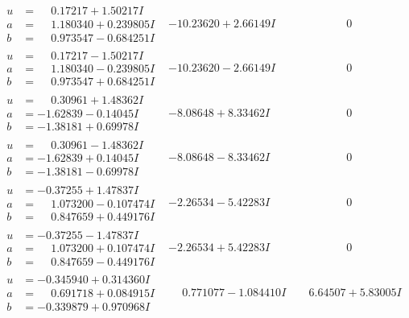 \documentclass[1p]{elsarticle_modified}
\theoremstyle{definition}
\begin{document}
$$\begin{array}{c|c|c}
\begin{aligned}
u &= \phantom{-}0.17217 + 1.50217 I \\
a &= \phantom{-}1.180340 + 0.239805 I \\
b &= \phantom{-}0.973547 - 0.684251 I\end{aligned}
 & -10.23620 + 2.66149 I & \phantom{-0.000000 } 0 \\ \hline\begin{aligned}
u &= \phantom{-}0.17217 - 1.50217 I \\
a &= \phantom{-}1.180340 - 0.239805 I \\
b &= \phantom{-}0.973547 + 0.684251 I\end{aligned}
 & -10.23620 - 2.66149 I & \phantom{-0.000000 } 0 \\ \hline\begin{aligned}
u &= \phantom{-}0.30961 + 1.48362 I \\
a &= -1.62839 - 0.14045 I \\
b &= -1.38181 + 0.69978 I\end{aligned}
 & -8.08648 + 8.33462 I & \phantom{-0.000000 } 0 \\ \hline\begin{aligned}
u &= \phantom{-}0.30961 - 1.48362 I \\
a &= -1.62839 + 0.14045 I \\
b &= -1.38181 - 0.69978 I\end{aligned}
 & -8.08648 - 8.33462 I & \phantom{-0.000000 } 0 \\ \hline\begin{aligned}
u &= -0.37255 + 1.47837 I \\
a &= \phantom{-}1.073200 - 0.107474 I \\
b &= \phantom{-}0.847659 + 0.449176 I\end{aligned}
 & -2.26534 - 5.42283 I & \phantom{-0.000000 } 0 \\ \hline\begin{aligned}
u &= -0.37255 - 1.47837 I \\
a &= \phantom{-}1.073200 + 0.107474 I \\
b &= \phantom{-}0.847659 - 0.449176 I\end{aligned}
 & -2.26534 + 5.42283 I & \phantom{-0.000000 } 0 \\ \hline\begin{aligned}
u &= -0.345940 + 0.314360 I \\
a &= \phantom{-}0.691718 + 0.084915 I \\
b &= -0.339879 + 0.970968 I\end{aligned}
 & \phantom{-}0.771077 - 1.084410 I & \phantom{-}6.64507 + 5.83005 I\\

\end{array}$$
\end{document}
